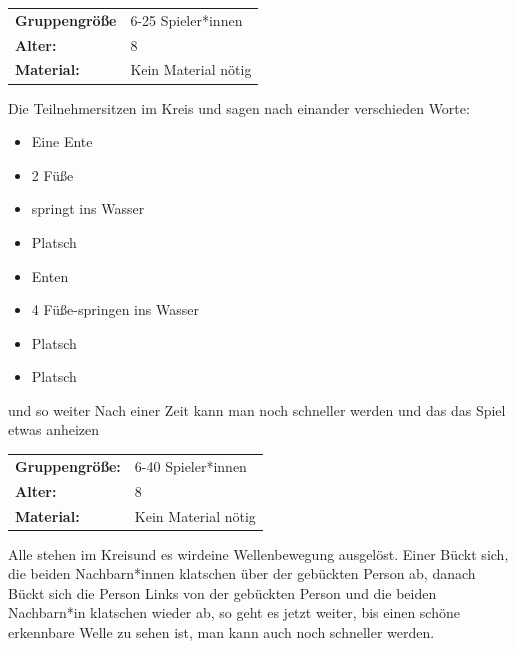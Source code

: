 \newpage
\begin{table}[H]
	\begin{tabular}{>{\bfseries}lp{8cm}}
		Gruppengröße   & 6-25 Spieler*innen\\
		Alter: & 8 \\
		Material: & Kein Material nötig \\
	\end{tabular}
\end{table}
 Die Teilnehmersitzen im Kreis und sagen nach einander verschieden Worte:
    \begin{itemize}
        \item Eine Ente
        \item 2 Füße
        \item springt ins Wasser
        \item Platsch
        \item Enten
        \item 4 Füße-springen ins Wasser
        \item Platsch
        \item Platsch
    \end{itemize} 
    und so weiter Nach einer Zeit kann man noch schneller werden und das das Spiel etwas anheizen\\



\begin{table}[H]
\begin{tabular}{>{\bfseries}lp{8cm}}
   Gruppengröße:   & 6-40 Spieler*innen\\
    Alter: & 8 \\
    Material: & Kein Material nötig\\
\end{tabular}
\end{table} 
Alle stehen im Kreisund es wirdeine Wellenbewegung ausgelöst. Einer Bückt sich, die beiden Nachbarn*innen klatschen über der gebückten Person ab, danach Bückt sich die Person Links von der gebückten Person und die beiden Nachbarn*in klatschen wieder ab, so geht es jetzt weiter, bis einen schöne erkennbare Welle zu sehen ist, man kann auch noch schneller werden. 
\\



